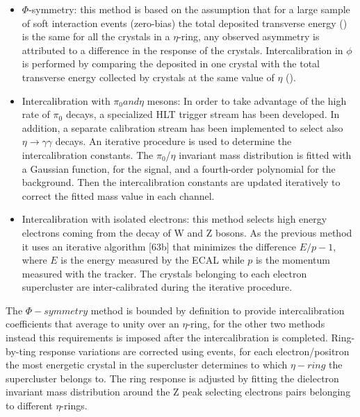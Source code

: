 \begin{itemize}
\item $\Phi$-symmetry: this method is based on the assumption that for a large sample of soft interaction
events (zero-bias) the total deposited transverse energy (\sumEt) is the same for all the crystals in a
$\eta$-ring, any observed asymmetry is attributed to a difference in the response of the crystals.
Intercalibration in $\phi$ is performed by comparing the \sumEt deposited in one crystal
with the total transverse energy collected by crystals at the same value of $\eta$ (\sumEtring).

\item Intercalibration with $\pi_0 and \eta$ mesons:
  In order to take advantage of the high rate of $\pi_0$ decays, a specialized HLT trigger stream has
been developed. In addition, a separate calibration stream has been implemented to select also
$\eta\to\gamma\gamma$ decays. An iterative procedure is used to determine the intercalibration constants.
The $\pi_0$/$\eta$ invariant mass distribution is fitted with a Gaussian function, for the signal, and a
fourth-order polynomial for the background. Then the intercalibration constants are updated
iteratively to correct the fitted mass value in each channel.

\item Intercalibration with isolated electrons: this method selects high energy electrons coming from the decay of
  W and Z bosons. As the previous method it uses an iterative algorithm [63b] that minimizes the difference $E/p - 1$,
  where $E$ is the energy measured by the ECAL while $p$ is the momentum measured with the tracker.
  The crystals belonging to each electron supercluster are inter-calibrated during the iterative procedure.
\end{itemize}

The $\Phi-symmetry$ method is bounded by definition to provide intercalibration coefficients that average to unity
over an $\eta$-ring, for the other two methods instead this requirements is imposed after the intercalibration is completed.
Ring-by-ting response variations are corrected using \Zee events, for each electron/positron the most energetic crystal in the
supercluster determines to which $\eta-ring$ the supercluster belongs to. The ring response is adjusted by fitting the dielectron
invariant mass distribution around the Z peak selecting electrons pairs belonging to different $\eta$-rings.

